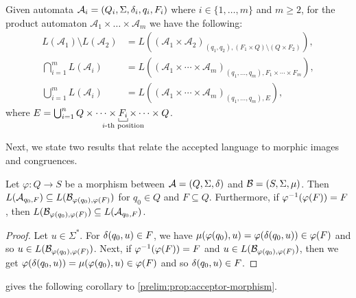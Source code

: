 Given automata $\automat{A_i}{Q_i}{\Sigma}{\delta_i}{q_i}{F_i}$
where $i \in \{1,\ldots,m\}$ and $m \ge 2$, 
for the product automaton $\mathcal A_1 \times \ldots \times \mathcal A_m$
we have the following:
\begingroup
\allowdisplaybreaks 
\begin{align}
	L(\mathcal A_1) \setminus L(\mathcal A_2) & = L((\mathcal A_1 \times \mathcal A_2)_{(q_1, q_2), ( F_1 \times Q )\setminus (Q \times F_2)}), \\
	\bigcap_{i=1}^m L(\mathcal A_i) & = L((\mathcal A_1 \times \cdots \times \mathcal A_m)_{(q_1,\ldots,q_m), F_1 \times \cdots \times F_m}), \label{prelim:eqn:product-intersection}	\\
	\bigcup_{i=1}^m L(\mathcal A_i) & = L((\mathcal A_1 \times \cdots \times \mathcal A_m)_{(q_1,\ldots,q_m), E}), 
\end{align}
\endgroup%
where $E = \bigcup_{i=1}^n Q \times \cdots \times \underbracket[0.4pt]{F_i}_{\clap{\scriptsize$i$-th position}} \times \cdots \times Q$.

Next, we state two results that relate the accepted language to morphic images and congruences.

\begin{proposition}
\label{prelim:prop:acceptor-morphism}
	Let $\varphi \colon Q \to S$ be a morphism between $\semiautomat{A}{Q}{\Sigma}{\delta}$
	and $\semiautomat{B}{S}{\Sigma}{\mu}$.
	Then $L(\mathcal A_{q_0,F}) \subseteq L(\mathcal B_{\applyfunc{q_0}{\varphi}, \applyfunc{F}{\varphi}})$
	for $q_0 \in Q$ and $F \subseteq Q$.
	Furthermore, if $\applyfunc{\applyfunc{F}{\varphi}}{\varphi^{-1}} = F$,
	then $L(\mathcal B_{\applyfunc{q_0}{\varphi}, \applyfunc{F}{\varphi}}) \subseteq L(\mathcal A_{q_0,F})$.
\end{proposition}
\begin{proof}
	Let $u \in \Sigma^*$.
	For $\applytrans{\delta}{q_0}{u} \in F$,
	we have $\applytrans{\mu}{\applyfunc{q_0}{\varphi}}{u} = \applyfunc{\applytrans{\delta}{q_0}{u}}{\varphi} \in \applyfunc{F}{\varphi}$ and so $u \in L(\mathcal B_{\applyfunc{q_0}{\varphi}, \applyfunc{F}{\varphi}})$.
	Next, if $\applyfunc{\applyfunc{F}{\varphi}}{\varphi^{-1}} = F$
	and $u \in L(\mathcal B_{\applyfunc{q_0}{\varphi}, \applyfunc{F}{\varphi}})$,
	then we get $\applyfunc{\applytrans{\delta}{q_0}{u}}{\varphi} = \applytrans{\mu}{\applyfunc{q_0}{\varphi}}{u} \in  \applyfunc{F}{\varphi}$
	and so $\applytrans{\delta}{q_0}{u} \in F$.
\end{proof}

gives the following corollary to \cref{prelim:prop:acceptor-morphism}.

